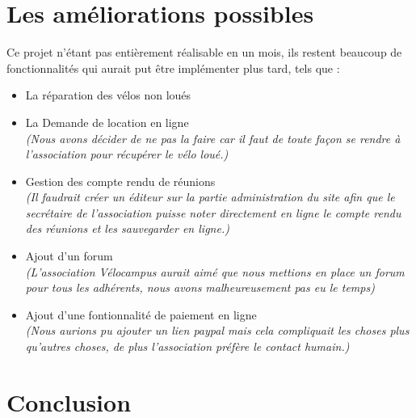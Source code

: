 \documentclass[11pt,a4paper,titlepage]{report}
\begin{document}
\chapter{Les améliorations possibles}
Ce projet n'étant pas entièrement réalisable en un mois, ils restent beaucoup de fonctionnalités qui aurait put être implémenter plus tard, tels que : \\
\begin{itemize}
\item La réparation des vélos non loués 
\item La Demande de location en ligne \\
\textit{(Nous avons décider de ne pas la faire car il faut de toute façon se rendre à l'association pour récupérer le vélo loué.)}
\item Gestion des compte rendu de réunions \\ \textit{(Il faudrait créer un éditeur sur la partie administration du site afin que le secrétaire de l'association puisse noter directement en ligne le compte rendu des réunions et les sauvegarder en ligne.)} 
\item Ajout d'un forum \\
\textit{(L'association Vélocampus aurait aimé que nous mettions en place un forum pour tous les adhérents, nous avons malheureusement pas eu le temps)} 
\item Ajout d'une fontionnalité de paiement en ligne \\
\textit{(Nous aurions pu ajouter un lien paypal mais cela compliquait les choses plus qu'autres choses, de plus l'association préfère le contact humain.)} 
\end{itemize}
\chapter*{Conclusion}
\end{document}
